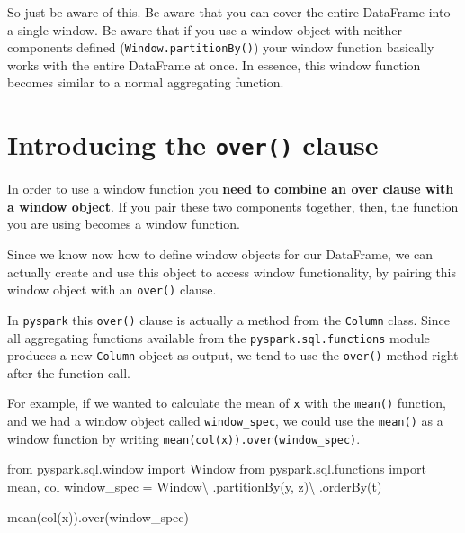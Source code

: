 \documentclass[
  11pt,
  letterpaper,
  DIV=11,
  numbers=noendperiod]{scrreprt}
\newenvironment{Shaded}{\begin{snugshade}}{\end{snugshade}}
\newcommand{\ImportTok}[1]{\textcolor[rgb]{0.00,0.46,0.62}{#1}}
\newcommand{\NormalTok}[1]{\textcolor[rgb]{0.00,0.23,0.31}{#1}}
\newcommand{\OperatorTok}[1]{\textcolor[rgb]{0.37,0.37,0.37}{#1}}
\newcommand{\StringTok}[1]{\textcolor[rgb]{0.13,0.47,0.30}{#1}}
\begin{document}
So just be aware of this. Be aware that you can cover the entire
DataFrame into a single window. Be aware that if you use a window object
with neither components defined (\texttt{Window.partitionBy()}) your
window function basically works with the entire DataFrame at once. In
essence, this window function becomes similar to a normal aggregating
function.

\hypertarget{introducing-the-over-clause}{%
\section{\texorpdfstring{Introducing the \texttt{over()}
clause}{Introducing the over() clause}}\label{introducing-the-over-clause}}

In order to use a window function you \textbf{need to combine an over
clause with a window object}. If you pair these two components together,
then, the function you are using becomes a window function.

Since we know now how to define window objects for our DataFrame, we can
actually create and use this object to access window functionality, by
pairing this window object with an \texttt{over()} clause.

In \texttt{pyspark} this \texttt{over()} clause is actually a method
from the \texttt{Column} class. Since all aggregating functions
available from the \texttt{pyspark.sql.functions} module produces a new
\texttt{Column} object as output, we tend to use the \texttt{over()}
method right after the function call.

For example, if we wanted to calculate the mean of \texttt{x} with the
\texttt{mean()} function, and we had a window object called
\texttt{window\_spec}, we could use the \texttt{mean()} as a window
function by writing
\texttt{mean(col(\textquotesingle{}x\textquotesingle{})).over(window\_spec)}.

\begin{Shaded}
\begin{Highlighting}[]
\ImportTok{from}\NormalTok{ pyspark.sql.window }\ImportTok{import}\NormalTok{ Window}
\ImportTok{from}\NormalTok{ pyspark.sql.functions }\ImportTok{import}\NormalTok{ mean, col}
\NormalTok{window\_spec }\OperatorTok{=}\NormalTok{ Window}\OperatorTok{\textbackslash{}}
\NormalTok{    .partitionBy(}\StringTok{\textquotesingle{}y\textquotesingle{}}\NormalTok{, }\StringTok{\textquotesingle{}z\textquotesingle{}}\NormalTok{)}\OperatorTok{\textbackslash{}}
\NormalTok{    .orderBy(}\StringTok{\textquotesingle{}t\textquotesingle{}}\NormalTok{)}

\NormalTok{mean(col(}\StringTok{\textquotesingle{}x\textquotesingle{}}\NormalTok{)).over(window\_spec)}
\end{Highlighting}
\end{Shaded}
\end{document}
